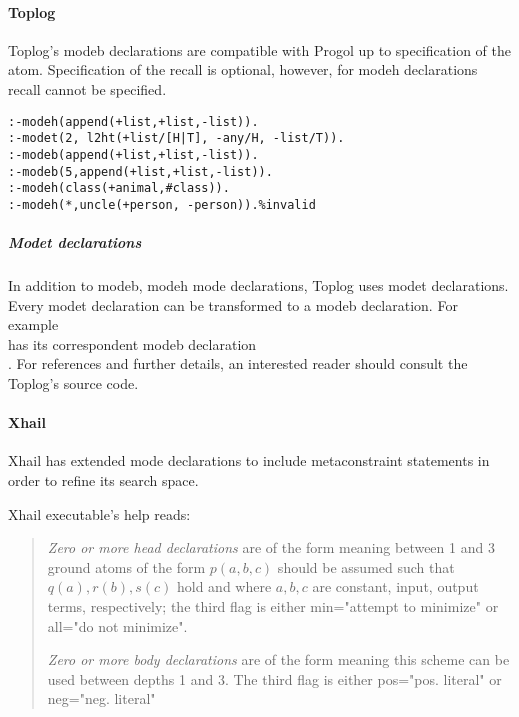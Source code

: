 \paragraph{Toplog}
Toplog's modeb declarations are compatible with Progol up to specification of the atom. Specification of the recall is optional, however, for modeh declarations recall cannot be specified\cite{santos2008toplogWebsite}.
\begin{exmp}\cite{santos2008toplogWebsite}
\begin{lstlisting}
:-modeh(append(+list,+list,-list)).
:-modet(2, l2ht(+list/[H|T], -any/H, -list/T)).
:-modeb(append(+list,+list,-list)).
:-modeb(5,append(+list,+list,-list)).
:-modeh(class(+animal,#class)).
:-modeh(*,uncle(+person, -person)).%invalid
\end{lstlisting}
\end{exmp}

\subparagraph{Modet declarations}
In addition to modeb, modeh mode declarations, Toplog uses modet declarations. Every modet declaration can be transformed to a modeb declaration. For example\\
 has its correspondent modeb declaration\\
.
For references and further details, an interested reader should consult the Toplog's source code\cite{santos2008toplogWebsite}.

\paragraph{Xhail}
Xhail has extended mode declarations to include metaconstraint statements in order to refine its search space.

Xhail executable's help\cite{ray2007xhail} reads:
\begin{quote}
\emph{Zero or more head declarations} are of the form
 meaning between 1 and 3 ground atoms
 of the form $p(a,b,c)$ should be assumed such that $q(a), r(b), s(c)$ hold 
 and where $a, b, c$ are constant, input, output terms, respectively;
 the third flag is either min="attempt to minimize" or all="do not minimize".
 
\emph{Zero or more body declarations} are of the form  meaning this scheme can be used between 
 depths 1 and 3.  The third flag is either pos="pos. literal" or neg="neg. literal" 
\end{quote}

